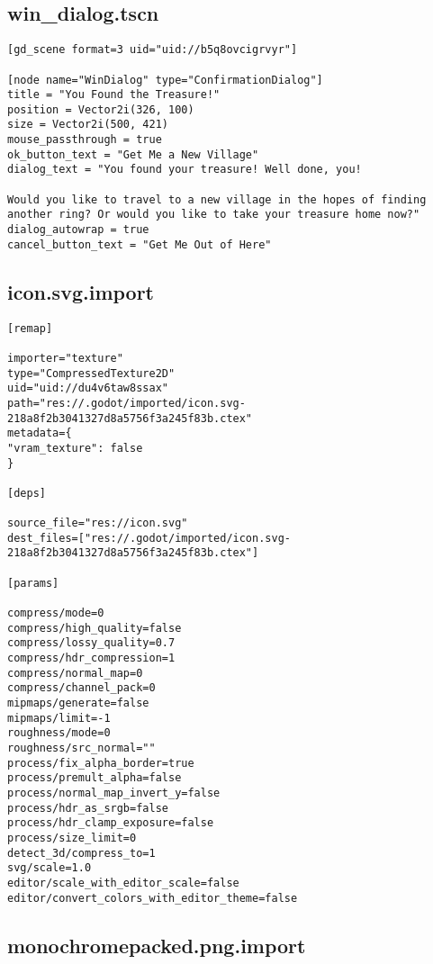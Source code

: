 \subsection{win\_dialog.tscn}

\begin{lstlisting}
[gd_scene format=3 uid="uid://b5q8ovcigrvyr"]

[node name="WinDialog" type="ConfirmationDialog"]
title = "You Found the Treasure!"
position = Vector2i(326, 100)
size = Vector2i(500, 421)
mouse_passthrough = true
ok_button_text = "Get Me a New Village"
dialog_text = "You found your treasure! Well done, you!

Would you like to travel to a new village in the hopes of finding another ring? Or would you like to take your treasure home now?"
dialog_autowrap = true
cancel_button_text = "Get Me Out of Here"
\end{lstlisting}

\subsection{icon.svg.import}

\begin{lstlisting}
[remap]

importer="texture"
type="CompressedTexture2D"
uid="uid://du4v6taw8ssax"
path="res://.godot/imported/icon.svg-218a8f2b3041327d8a5756f3a245f83b.ctex"
metadata={
"vram_texture": false
}

[deps]

source_file="res://icon.svg"
dest_files=["res://.godot/imported/icon.svg-218a8f2b3041327d8a5756f3a245f83b.ctex"]

[params]

compress/mode=0
compress/high_quality=false
compress/lossy_quality=0.7
compress/hdr_compression=1
compress/normal_map=0
compress/channel_pack=0
mipmaps/generate=false
mipmaps/limit=-1
roughness/mode=0
roughness/src_normal=""
process/fix_alpha_border=true
process/premult_alpha=false
process/normal_map_invert_y=false
process/hdr_as_srgb=false
process/hdr_clamp_exposure=false
process/size_limit=0
detect_3d/compress_to=1
svg/scale=1.0
editor/scale_with_editor_scale=false
editor/convert_colors_with_editor_theme=false
\end{lstlisting}

\subsection{monochrome\textunderscore{}packed.png.import}

